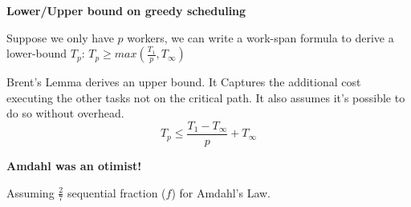 \par {\Large {\textbf{Lower/Upper bound  on greedy scheduling}}}
\par Suppose we only have $p$ workers, we can write a work-span formula to derive a lower-bound $T_p$: $T_p \geq max(\frac{T_1}{p}, T_\infty)$\\
\begin{minipage}{0.7\textwidth}
        \par Brent's Lemma derives an upper bound. It Captures the additional cost executing the other tasks not on the critical path. It also assumes it's possible to do so without overhead.
    \[T_p \leq \frac{T_1-T_\infty}{p} + T_\infty\]
\end{minipage}
\begin{minipage}{0.3\textwidth}
    \raggedleft
    \par {}
\end{minipage}
%
\clearpage
%
\par {\large \textbf{Amdahl was an otimist!}}
\par Assuming $\frac{2}{7}$ sequential fraction ($f$) for Amdahl's Law.
